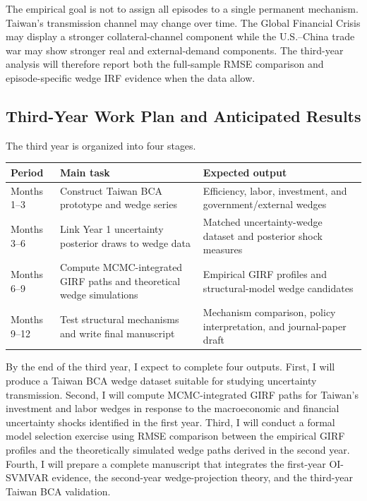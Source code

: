 \documentclass[12pt]{article}
\begin{document}
The empirical goal is not to assign all episodes to a single permanent mechanism. Taiwan's
transmission channel may change over time. The Global Financial Crisis may display a stronger
collateral-channel component while the U.S.--China trade war may show stronger real and
external-demand components. The third-year analysis will therefore report both the full-sample
RMSE comparison and episode-specific wedge IRF evidence when the data allow.

\subsection{Third-Year Work Plan and Anticipated Results}

The third year is organized into four stages.

\begin{center}
\begin{tabular}{p{}p{}p{}}
\toprule
Period & Main task & Expected output \\
\midrule
Months 1--3 &
Construct Taiwan BCA prototype and wedge series &
Efficiency, labor, investment, and government/external wedges \\
\addlinespace
Months 3--6 &
Link Year 1 uncertainty posterior draws to wedge data &
Matched uncertainty-wedge dataset and posterior shock measures \\
\addlinespace
Months 6--9 &
Compute MCMC-integrated GIRF paths and theoretical wedge simulations &
Empirical GIRF profiles and structural-model wedge candidates \\
\addlinespace
Months 9--12 &
Test structural mechanisms and write final manuscript &
Mechanism comparison, policy interpretation, and journal-paper draft \\
\bottomrule
\end{tabular}
\end{center}

By the end of the third year, I expect to complete four outputs. First, I will produce a Taiwan
BCA wedge dataset suitable for studying uncertainty transmission. Second, I will compute
MCMC-integrated GIRF paths for Taiwan's investment and labor wedges in response to the
macroeconomic and financial uncertainty shocks identified in the first year. Third, I will
conduct a formal model selection exercise using RMSE comparison between the empirical GIRF
profiles and the theoretically simulated wedge paths derived in the second year. Fourth, I will
prepare a complete manuscript that integrates the first-year OI-SVMVAR evidence, the
second-year wedge-projection theory, and the third-year Taiwan BCA validation.
\end{document}
